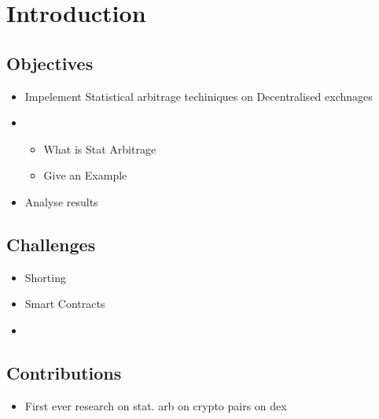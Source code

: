 \chapter{Introduction}
\section{Objectives}
\begin{itemize}
    \item Impelement Statistical arbitrage techiniques on Decentralised exchnages
    \item \begin{itemize}
        \item What is Stat Arbitrage
        \item Give an Example
    \end{itemize}
    \item Analyse results
\end{itemize}

\section{Challenges}
\begin{itemize}
    \item Shorting
    \item Smart Contracts
    \item 
\end{itemize}

\section{Contributions}
\begin{itemize}
    \item First ever research on stat. arb on crypto pairs on dex
\end{itemize}
